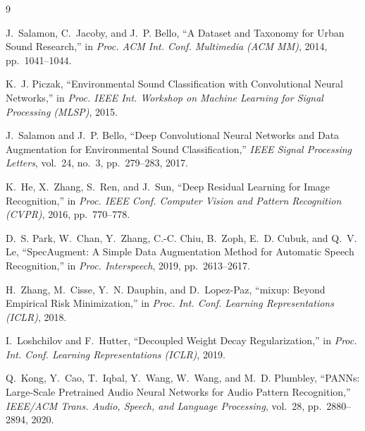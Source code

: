 
\begin{thebibliography}{9}

J.~Salamon, C.~Jacoby, and J.~P. Bello,
``A Dataset and Taxonomy for Urban Sound Research,''
in \textit{Proc. ACM Int. Conf. Multimedia (ACM MM)}, 2014, pp.~1041--1044.

K.~J. Piczak,
``Environmental Sound Classification with Convolutional Neural Networks,''
in \textit{Proc. IEEE Int. Workshop on Machine Learning for Signal Processing (MLSP)}, 2015.

J.~Salamon and J.~P. Bello,
``Deep Convolutional Neural Networks and Data Augmentation for Environmental Sound Classification,''
\textit{IEEE Signal Processing Letters}, vol.~24, no.~3, pp.~279--283, 2017.

K.~He, X.~Zhang, S.~Ren, and J.~Sun,
``Deep Residual Learning for Image Recognition,''
in \textit{Proc. IEEE Conf. Computer Vision and Pattern Recognition (CVPR)}, 2016, pp.~770--778.

D.~S. Park, W.~Chan, Y.~Zhang, C.-C. Chiu, B.~Zoph, E.~D. Cubuk, and Q.~V. Le,
``SpecAugment: A Simple Data Augmentation Method for Automatic Speech Recognition,''
in \textit{Proc. Interspeech}, 2019, pp.~2613--2617.

H.~Zhang, M.~Cisse, Y.~N. Dauphin, and D.~Lopez-Paz,
``mixup: Beyond Empirical Risk Minimization,''
in \textit{Proc. Int. Conf. Learning Representations (ICLR)}, 2018.

I.~Loshchilov and F.~Hutter,
``Decoupled Weight Decay Regularization,''
in \textit{Proc. Int. Conf. Learning Representations (ICLR)}, 2019.

Q.~Kong, Y.~Cao, T.~Iqbal, Y.~Wang, W.~Wang, and M.~D. Plumbley,
``PANNs: Large-Scale Pretrained Audio Neural Networks for Audio Pattern Recognition,''
\textit{IEEE/ACM Trans. Audio, Speech, and Language Processing}, vol.~28, pp.~2880--2894, 2020.

\end{thebibliography}

